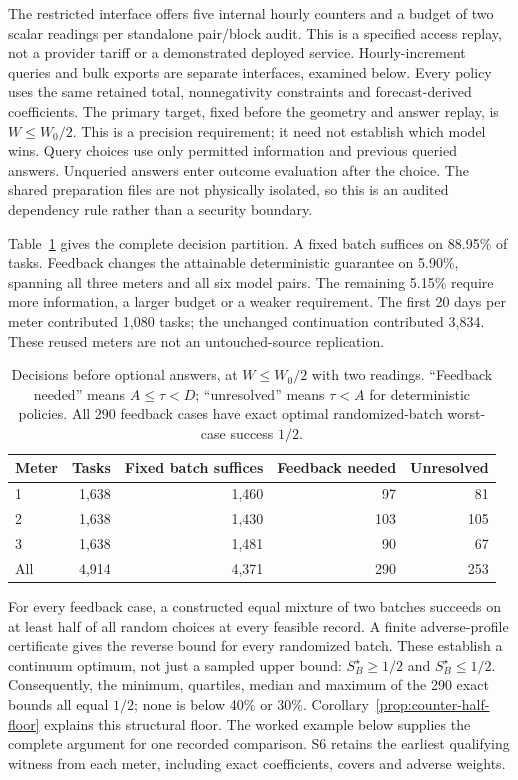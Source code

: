 \documentclass[12pt]{article}
\begin{document}
The restricted interface offers five internal hourly counters and a budget
of two scalar readings per standalone pair/block audit. This is a specified
access replay, not a provider tariff or a demonstrated deployed service.
Hourly-increment queries and bulk exports are separate interfaces, examined
below. Every policy uses the same retained total, nonnegativity constraints
and forecast-derived coefficients. The primary target, fixed before the
geometry and answer replay, is $W\leq W_0/2$. This is a precision requirement;
it need not establish which model wins. Query choices use only permitted
information and previous queried answers. Unqueried answers enter outcome
evaluation after the choice. The shared preparation files are not physically
isolated, so this is an audited dependency rule rather than a security boundary.

Table~\ref{tab:counter-guarantees} gives the complete decision partition.
A fixed batch suffices on 88.95\% of tasks. Feedback changes the attainable
deterministic guarantee on 5.90\%, spanning all three meters and all six
model pairs. The remaining 5.15\% require more information, a larger budget
or a weaker requirement. The first 20 days per meter contributed 1,080 tasks;
the unchanged continuation contributed 3,834. These reused meters are not
an untouched-source replication.

\begin{table}[htbp]\centering\small
\caption{Decisions before optional answers, at $W\leq W_0/2$ with two
readings. ``Feedback needed'' means $A\leq\tau<D$; ``unresolved'' means
$\tau<A$ for deterministic policies. All 290 feedback cases have exact
optimal randomized-batch worst-case success $1/2$.}
\label{tab:counter-guarantees}
\begin{tabular}{lrrrr}\toprule
Meter & Tasks & Fixed batch suffices & Feedback needed & Unresolved\\\midrule
1 & 1,638 & 1,460 & 97 & 81\\
2 & 1,638 & 1,430 & 103 & 105\\
3 & 1,638 & 1,481 & 90 & 67\\
All & 4,914 & 4,371 & 290 & 253\\\bottomrule
\end{tabular}\end{table}

For every feedback case, a constructed equal mixture of two batches
succeeds on at least half of all random choices at every feasible record.
A finite adverse-profile certificate gives the reverse bound for every
randomized batch. These establish a continuum optimum, not just a sampled
upper bound: $S_B^\star\geq1/2$ and $S_B^\star\leq1/2$.
Consequently, the minimum, quartiles, median and maximum of the 290 exact
bounds all equal $1/2$; none is below 40\% or 30\%.
Corollary~\ref{prop:counter-half-floor} explains this structural floor.
The worked example below supplies the complete argument for one recorded
comparison. S6 retains the earliest qualifying witness from each meter,
including exact coefficients, covers and adverse weights.
\end{document}
